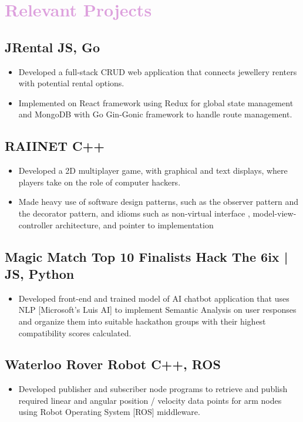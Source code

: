 \documentclass{article}
\begin{document}
\section*{\Large \faGears  {\hspace{0.5em}} {\textcolor{Plum} {Relevant Projects}}} 
		\subsection*{JRental {\small {\color{Plum} JS, Go}}}
			\begin{itemize}[label={\color{Plum} \faCaretRight}]
			\itemsep0em
			\item Developed a full-stack CRUD web application that connects jewellery renters with potential rental options.  
			\item Implemented on React framework using Redux for global state management and MongoDB with Go Gin-Gonic framework to handle route management. 
			\end{itemize}
		\subsection*{RAIINET {\small {\color{Plum} C++}}} 
			\begin{itemize}[label={\color{Plum} \faCaretRight}]
			\itemsep0em
			\item Developed a 2D multiplayer game, with graphical and text displays, where players take on the role of computer hackers. 
			\item Made heavy use of software design patterns, such as the observer pattern and the decorator pattern, and idioms such as non-virtual interface , model-view-controller architecture, and pointer to implementation
			\end{itemize}
		\subsection*{Magic Match  {\small {\color{Plum} Top 10 Finalists Hack The 6ix | JS, Python}}}
			\begin{itemize}[label={\color{Plum} \faCaretRight}]
			\itemsep0em
			\item Developed front-end and trained model of AI chatbot application that uses NLP [Microsoft's Luis AI] to implement Semantic Analysis on user responses and organize them into suitable hackathon groups with their highest compatibility scores calculated. 
			\end{itemize} 
		\subsection*{Waterloo Rover Robot {\small {\color{Plum} C++, ROS}}} 
			\begin{itemize}[label={\color{Plum} \faCaretRight}]
			\item Developed publisher and subscriber node programs to retrieve and publish required linear and angular position / velocity data points for arm nodes using Robot Operating System [ROS] middleware. 
			\end{itemize}
\end{document}
